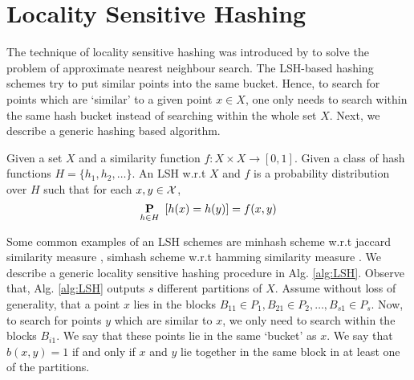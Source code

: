 \section{Locality Sensitive Hashing}
\label{section:A-LSH}
The technique of locality sensitive hashing was introduced by \cite{gionis1999similarity} to solve the problem of approximate nearest neighbour search. The LSH-based hashing schemes try to put similar points into the same bucket. Hence, to search for points which are `similar' to a given point $x \in X$, one only needs to search within the same hash bucket instead of searching within the whole set $X$. Next, we describe a generic hashing based algorithm. 

\begin{definition}
\label{defn:LSH}
Given a set $X$ and a similarity function $f:X \times X \rightarrow [0, 1]$. Given a class of hash functions $H = \{h_1, h_2, \ldots \}$. An LSH w.r.t $X$ and $f$ is a probability distribution over $H$ such that for each $x, y \in \mathcal X$, $$\underset{h \in H}{\mathbf P}\enspace [h(x) = h(y)] = f(x, y)$$
\end{definition}
\noindent Some common examples of an LSH schemes are minhash scheme w.r.t jaccard similarity measure \cite{broder2000min, broder1997resemblance}, simhash scheme w.r.t hamming similarity measure \cite{charikar2002similarity}. We describe a generic locality sensitive hashing procedure in Alg. \ref{alg:LSH}. Observe that, Alg. \ref{alg:LSH} outputs $s$ different partitions of $X$. Assume without loss of generality, that a point $x$ lies in the blocks $B_{11} \in P_1, B_{21} \in P_2, \ldots, B_{s1} \in P_s$. Now, to search for points $y$ which are similar to $x$, we only need to search within the blocks $B_{i1}$. We say that these points lie in the same `bucket' as $x$. We say that $b(x, y) = 1$ if and only if $x$ and $y$ lie together in the same block in at least one of the partitions.

